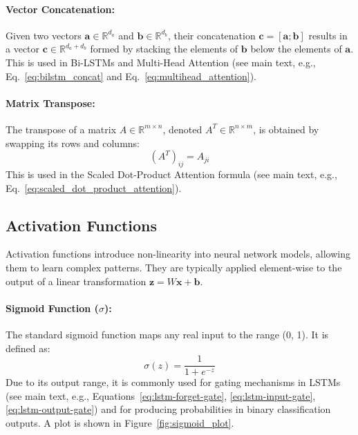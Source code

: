 \begin{appendices}
  \paragraph{Vector Concatenation:}
  Given two vectors \( \bm{a} \in \mathbb{R}^{d_a} \) and \( \bm{b} \in \mathbb{R}^{d_b} \), their concatenation \( \bm{c} = [\bm{a} ; \bm{b}] \) results in a vector \( \bm{c} \in \mathbb{R}^{d_a + d_b} \) formed by stacking the elements of \( \bm{b} \) below the elements of \( \bm{a} \). This is used in Bi-LSTMs and Multi-Head Attention (see main text, e.g., Eq.~\ref{eq:bilstm_concat} and Eq.~\ref{eq:multihead_attention}). %

  \paragraph{Matrix Transpose:}
  The transpose of a matrix \( A \in \mathbb{R}^{m \times n} \), denoted \( A^T \in \mathbb{R}^{n \times m} \), is obtained by swapping its rows and columns:
  \begin{equation}
    (A^T)_{ij} = A_{ji} %
  \end{equation}
  This is used in the Scaled Dot-Product Attention formula (see main text, e.g., Eq.~\ref{eq:scaled_dot_product_attention}). %

  \subsection{Activation Functions}
  \label{subsec:activations_app} %
  Activation functions introduce non-linearity into neural network models, allowing them to learn complex patterns. They are typically applied element-wise to the output of a linear transformation \( \bm{z} = W\bm{x} + \bm{b} \).

  \paragraph{Sigmoid Function (\( \sigma \)):}
  The standard sigmoid function maps any real input to the range (0, 1). It is defined as:
  \begin{equation}
    \sigma(z) = \frac{1}{1 + e^{-z}} %
  \end{equation}
  Due to its output range, it is commonly used for gating mechanisms in LSTMs (see main text, e.g., Equations~\ref{eq:lstm-forget-gate}, \ref{eq:lstm-input-gate}, \ref{eq:lstm-output-gate}) and for producing probabilities in binary classification outputs. A plot is shown in Figure~\ref{fig:sigmoid_plot}.


\end{appendices}

